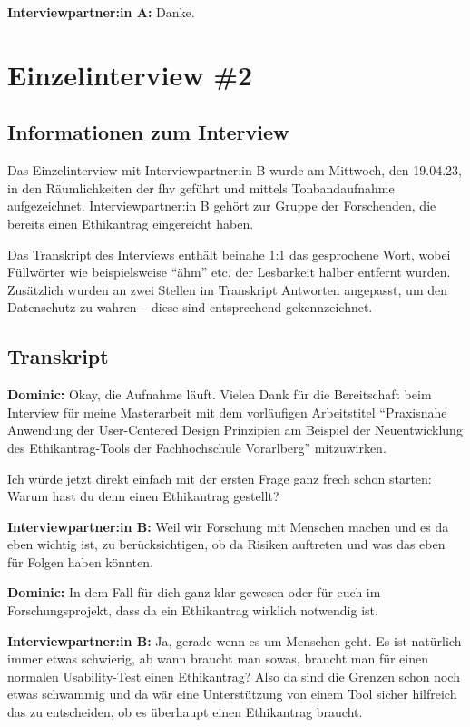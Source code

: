 \documentclass[a4paper,12pt,twoside]{scrreprt}
\begin{document}
\textbf{Interviewpartner:in A:} Danke.

\chapter{Einzelinterview \#2}
\label{appendix:interview-2}

\section{Informationen zum Interview}
\label{appendix:interview-2-infos}

Das Einzelinterview mit Interviewpartner:in B wurde am Mittwoch, den 19.04.23, in den Räumlichkeiten der \ac{fhv} geführt und mittels Tonbandaufnahme aufgezeichnet. Interviewpartner:in B gehört zur Gruppe der Forschenden, die bereits einen Ethikantrag eingereicht haben.

Das Transkript des Interviews enthält beinahe 1:1 das gesprochene Wort, wobei Füllwörter wie beispielsweise \enquote{ähm} etc. der Lesbarkeit halber entfernt wurden. Zusätzlich wurden an zwei Stellen im Transkript Antworten angepasst, um den Datenschutz zu wahren -- diese sind entsprechend gekennzeichnet.

\section{Transkript}
\label{appendix:interview-2-transkript}

\textbf{Dominic:} Okay, die Aufnahme läuft. Vielen Dank für die Bereitschaft beim Interview für meine Masterarbeit mit dem vorläufigen Arbeitstitel \enquote{Praxisnahe Anwendung der User-Centered Design Prinzipien am Beispiel der Neuentwicklung des Ethikantrag-Tools der Fachhochschule Vorarlberg} mitzuwirken.

Ich würde jetzt direkt einfach mit der ersten Frage ganz frech schon starten: Warum hast du denn einen Ethikantrag gestellt?

\textbf{Interviewpartner:in B:} Weil wir Forschung mit Menschen machen und es da eben wichtig ist, zu berücksichtigen, ob da Risiken auftreten und was das eben für Folgen haben könnten.

\textbf{Dominic:} In dem Fall für dich ganz klar gewesen oder für euch im Forschungsprojekt, dass da ein Ethikantrag wirklich notwendig ist.

\textbf{Interviewpartner:in B:} Ja, gerade wenn es um Menschen geht. Es ist natürlich immer etwas schwierig, ab wann braucht man sowas, braucht man für einen normalen Usability-Test einen Ethikantrag? Also da sind die Grenzen schon noch etwas schwammig und da wär eine Unterstützung von einem Tool sicher hilfreich das zu entscheiden, ob es überhaupt einen Ethikantrag braucht.
\end{document}
